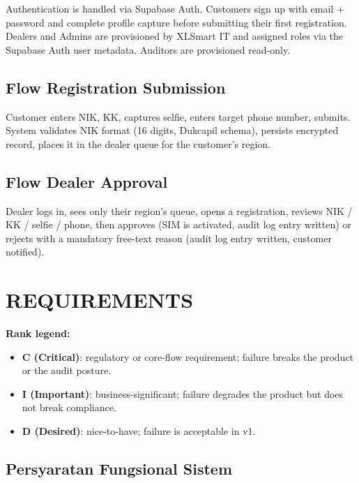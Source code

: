 \documentclass[12pt,a4paper]{article}
\begin{document}
Authentication is handled via Supabase Auth. Customers sign up with email + password and complete profile capture before submitting their first registration. Dealers and Admins are provisioned by XLSmart IT and assigned roles via the Supabase Auth user metadata. Auditors are provisioned read-only.

\subsection{Flow Registration Submission}

Customer enters NIK, KK, captures selfie, enters target phone number, submits. System validates NIK format (16 digits, Dukcapil schema), persists encrypted record, places it in the dealer queue for the customer's region.

\subsection{Flow Dealer Approval}

Dealer logs in, sees only their region's queue, opens a registration, reviews NIK / KK / selfie / phone, then approves (SIM is activated, audit log entry written) or rejects with a mandatory free-text reason (audit log entry written, customer notified).

\newpage

\section{REQUIREMENTS}

\textbf{Rank legend:}

\begin{itemize}
\item \textbf{C (Critical)}: regulatory or core-flow requirement; failure breaks the product or the audit posture.
\item \textbf{I (Important)}: business-significant; failure degrades the product but does not break compliance.
\item \textbf{D (Desired)}: nice-to-have; failure is acceptable in v1.
\end{itemize}

\vspace{0.5cm}

\subsection{Persyaratan Fungsional Sistem}
\end{document}
